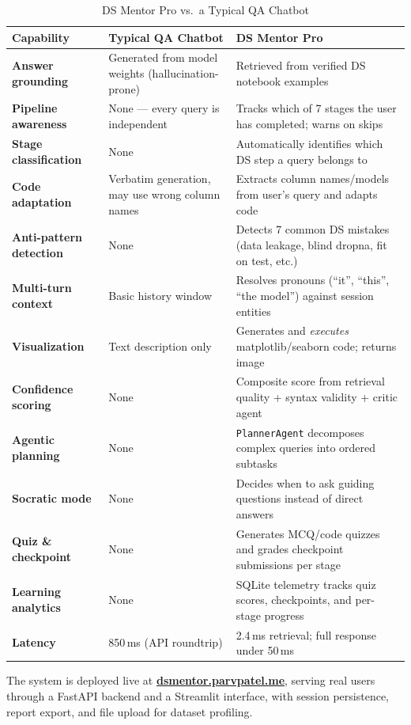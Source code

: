 \documentclass[12pt,a4paper]{article}
\begin{document}
\begin{table}[h!]
\centering
\caption{DS Mentor Pro vs.\ a Typical QA Chatbot}
\small
\begin{tabularx}{\textwidth}{>{\bfseries}lXX}
\toprule
Capability & Typical QA Chatbot & DS Mentor Pro \\
\midrule
Answer grounding & Generated from model weights (hallucination-prone) & Retrieved from verified DS notebook examples \\
Pipeline awareness & None --- every query is independent & Tracks which of 7 stages the user has completed; warns on skips \\
Stage classification & None & Automatically identifies which DS step a query belongs to \\
Code adaptation & Verbatim generation, may use wrong column names & Extracts column names/models from user's query and adapts code \\
Anti-pattern detection & None & Detects 7 common DS mistakes (data leakage, blind dropna, fit on test, etc.) \\
Multi-turn context & Basic history window & Resolves pronouns (``it'', ``this'', ``the model'') against session entities \\
Visualization & Text description only & Generates and \textit{executes} matplotlib/seaborn code; returns image \\
Confidence scoring & None & Composite score from retrieval quality + syntax validity + critic agent \\
Agentic planning & None & \texttt{PlannerAgent} decomposes complex queries into ordered subtasks \\
Socratic mode & None & Decides when to ask guiding questions instead of direct answers \\
Quiz \& checkpoint & None & Generates MCQ/code quizzes and grades checkpoint submissions per stage \\
Learning analytics & None & SQLite telemetry tracks quiz scores, checkpoints, and per-stage progress \\
Latency & 850\,ms (API roundtrip) & 2.4\,ms retrieval; full response under 50\,ms \\
\bottomrule
\end{tabularx}
\end{table}

The system is deployed live at \href{https://dsmentor.parvpatel.me}{\textbf{dsmentor.parvpatel.me}}, serving real users through a FastAPI backend and a Streamlit interface, with session persistence, report export, and file upload for dataset profiling.
\end{document}
